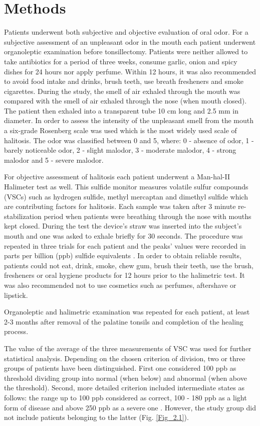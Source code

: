 \documentclass[12pt,a4paper,notitlepage]{report}
\begin{document}
\section{Methods}

Patients underwent both subjective and objective evaluation of oral odor. 
For a subjective assessment of an unpleasant odor in the mouth each patient underwent organoleptic examination before tonsillectomy. Patients were neither allowed to take antibiotics for a period of three weeks, consume garlic, onion and spicy dishes for 24 hours nor apply perfume. Within 12 hours, it was also recommended to avoid food intake and drinks, brush teeth, use breath fresheners and smoke cigarettes. During the study, the smell of air exhaled through the mouth was compared with the smell of air exhaled through the nose (when mouth closed). The patient then exhaled into a transparent tube 10 cm long and 2.5 mm in diameter. In order to assess the intensity of the unpleasant smell from the mouth a six-grade Rosenberg \cite{Rosenberg92} scale was used which is the most widely used scale of halitosis. The odor was classified between 0 and 5, where: 0 - absence of odor, 1 - barely noticeable odor, 2 - slight malodor, 3 - moderate malodor, 4 - strong malodor and 5 - severe malodor.\

For objective assessment of halitosis each patient underwent a Man-hal-II Halimeter test as well. This sulfide monitor measures volatile sulfur compounds (VSCs) such as hydrogen sulfide, methyl mercaptan and dimethyl sulfide which are contributing factors for halitosis. Each sample was taken after 3 minute re-stabilization period when patients were breathing through the nose with  mouths kept closed. During the test the device's straw was inserted into the subject’s mouth and one was asked to exhale briefly for 30 seconds. 
The procedure was repeated in three trials for each patient and the peaks' values were recorded in parts per billion (ppb) sulfide equivalents \cite{Alasqah16}.
In order to obtain reliable results, patients could not eat, drink, smoke, chew gum, brush their teeth, use the brush, fresheners or oral hygiene products for 12 hours prior to the halimetric test. It was also recommended not to use cosmetics such as perfumes, aftershave or lipstick. \

Organoleptic and halimetric examination was repeated for each patient, at least 2-3 months after removal of the palatine tonsils and completion of the healing process.

The value of the average of the three measurements of VSC was used for further statistical analysis. Depending on the chosen criterion of division, two or three groups of patients have been distinguished. First one considered 100 ppb as threshold dividing group into normal (when below) and abnormal (when above the threshold). Second, more detailed criterion included intermediate states as follows: the range up to 100 ppb considered as correct, 100 - 180 ppb as a light form of disease and above 250 ppb as a severe one \cite{Lee04}. However, the study group did not include patients belonging to the latter (Fig. \ref{Fig_2.1}).  
\end{document}
